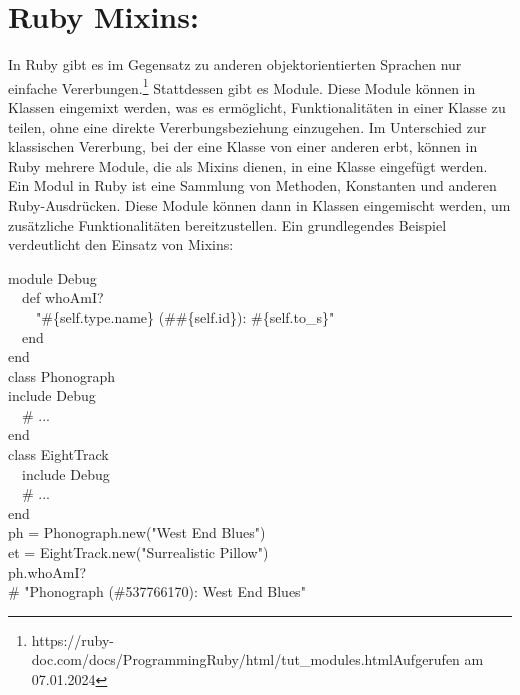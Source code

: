 \documentclass{article}
\begin{document}
\section*{Ruby Mixins:}
In Ruby gibt es im Gegensatz zu anderen objektorientierten Sprachen nur einfache Vererbungen.\footnote{https://ruby-doc.com/docs/ProgrammingRuby/html/tut\_modules.htmlAufgerufen am 07.01.2024} Stattdessen gibt es Module. Diese Module können in Klassen eingemixt werden, was es ermöglicht, Funktionalitäten in einer Klasse zu teilen, ohne eine direkte Vererbungsbeziehung einzugehen.
Im Unterschied zur klassischen Vererbung, bei der eine Klasse von einer anderen erbt, können in Ruby mehrere Module, die als Mixins dienen, in eine Klasse eingefügt werden. Ein Modul in Ruby ist eine Sammlung von Methoden, Konstanten und anderen Ruby-Ausdrücken. Diese Module können dann in Klassen eingemischt werden, um zusätzliche Funktionalitäten bereitzustellen.
Ein grundlegendes Beispiel verdeutlicht den Einsatz von Mixins:

module Debug \\ 
  def whoAmI? \\ 
    "\#\{self.type.name\} (\#\#\{self.id\}): \#\{self.to\_s\}" \\ 
  end \\ 
end \\ 

class Phonograph \\ 
include Debug \\ 
  \# ... \\ 
end \\ 

class EightTrack \\ 
  include Debug \\ 
  \# ... \\ 
end \\ 

ph = Phonograph.new("West End Blues") \\ 
et = EightTrack.new("Surrealistic Pillow") \\ 

ph.whoAmI? \\ 
\# "Phonograph (\#537766170): West End Blues" \\ 
\end{document}
